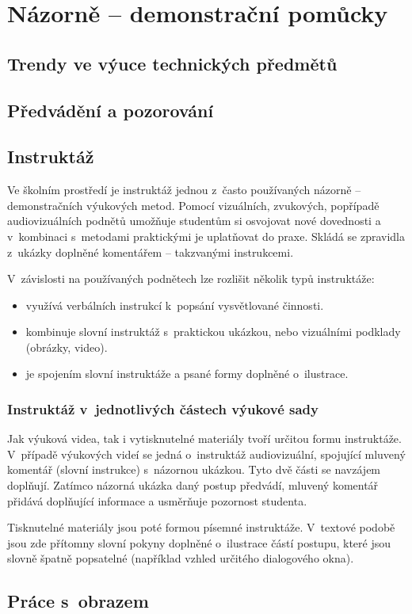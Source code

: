 \chapter{Názorně -- demonstrační pomůcky}


\section{Trendy ve výuce technických předmětů}

\section{Předvádění a pozorování}


\section{Instruktáž}
Ve školním prostředí je instruktáž jednou z~často používaných názorně -- demonstračních výukových metod.
Pomocí vizuálních, zvukových, popřípadě audiovizuálních podnětů umožňuje studentům si osvojovat nové dovednosti a v~kombinaci s~metodami praktickými je uplatňovat do praxe.
Skládá se zpravidla z~ukázky doplněné komentářem -- takzvanými instrukcemi.

\noindent V~závislosti na používaných podnětech lze rozlišit několik typů instruktáže:
\begin{itemize}[topsep=0pt]
    \setlength\itemsep{0em}
    \item {} využívá verbálních instrukcí k~popsání vysvětlované činnosti.
    \item {} kombinuje slovní instruktáž s~praktickou ukázkou, nebo vizuálními podklady (obrázky, video).
    \item {} je spojením slovní instruktáže a psané formy doplněné o~ilustrace.
\end{itemize}

\subsection{Instruktáž v~jednotlivých částech výukové sady}
Jak výuková videa, tak i vytisknutelné materiály tvoří určitou formu instruktáže.
V~případě výukových videí se jedná o~instruktáž audiovizuální, spojující mluvený komentář (slovní instrukce) s~názornou ukázkou.
Tyto dvě části se navzájem doplňují.
Zatímco názorná ukázka daný postup předvádí, mluvený komentář přidává doplňující informace a usměrňuje pozornost studenta.

Tisknutelné materiály jsou poté formou písemné instruktáže.
V~textové podobě jsou zde přítomny slovní pokyny doplněné o~ilustrace částí postupu, které jsou slovně špatně popsatelné (například vzhled určitého dialogového okna).

\section{Práce s~obrazem}

\newpage